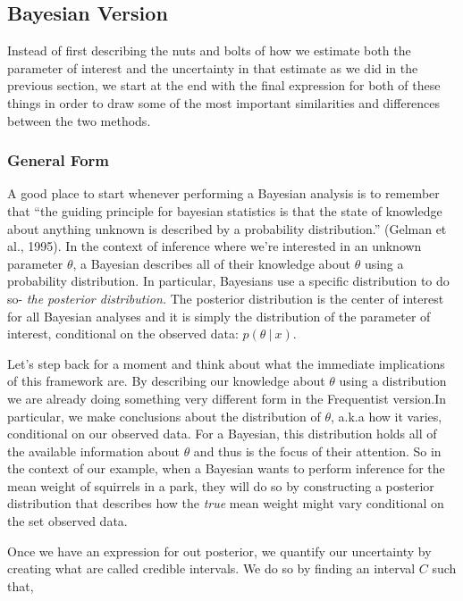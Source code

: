 \documentclass[12pt,twoside]{reedthesis}
\begin{document}
\hypertarget{bayesian-version}{%
\subsection{Bayesian Version}\label{bayesian-version}}

Instead of first describing the nuts and bolts of how we estimate both the parameter of interest and the uncertainty in that estimate as we did in the previous section, we start at the end with the final expression for both of these things in order to draw some of the most important similarities and differences between the two methods.

\hypertarget{general-form}{%
\subsubsection{General Form}\label{general-form}}

A good place to start whenever performing a Bayesian analysis is to remember that ``the guiding principle for bayesian statistics is that the state of knowledge about anything unknown is described by a probability distribution.'' (Gelman et al., 1995). In the context of inference where we're interested in an unknown parameter \(\theta\), a Bayesian describes all of their knowledge about \(\theta\) using a probability distribution. In particular, Bayesians use a specific distribution to do so- \emph{the posterior distribution.} The posterior distribution is the center of interest for all Bayesian analyses and it is simply the distribution of the parameter of interest, conditional on the observed data: \(p(\theta \ | \ x)\).

Let's step back for a moment and think about what the immediate implications of this framework are. By describing our knowledge about \(\theta\) using a distribution we are already doing something very different form in the Frequentist version.In particular, we make conclusions about the distribution of \(\theta\), a.k.a how it varies, conditional on our observed data. For a Bayesian, this distribution holds all of the available information about \(\theta\) and thus is the focus of their attention. So in the context of our example, when a Bayesian wants to perform inference for the mean weight of squirrels in a park, they will do so by constructing a posterior distribution that describes how the \emph{true} mean weight might vary conditional on the set observed data.

Once we have an expression for out posterior, we quantify our uncertainty by creating what are called credible intervals. We do so by finding an interval \(C\) such that,
\end{document}
